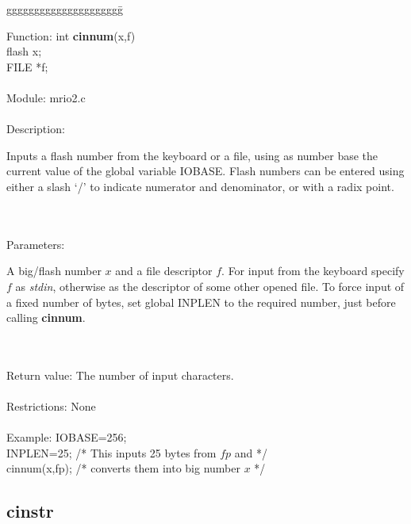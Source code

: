 \begin{tabbing}
ggggggggggggggggggggg\= \kill

      Function:      \>int {\bf cinnum}(x,f)  \\
                     \>flash x;  \\
                     \>FILE *f;  \\
      \ \\
      Module:        \>mrio2.c \\
      \ \\
      Description:   \>
                     \parbox[t]{3in}
                     {Inputs a flash number from the keyboard or a file,  
                     using as number base the current value of the 
                     global variable IOBASE. Flash numbers can be entered 
                     using either a slash `/' to indicate numerator and 
                     denominator, or with a radix point.} \\ 
      \ \\ 
      Parameters:    \>
                     \parbox[t]{3in}
                     {A big/flash number $x$ and a file descriptor $f$. For 
                     input from the keyboard specify $f$ as {\em stdin}, otherwise 
                     as the descriptor of some other opened file. 
                     To force input of a fixed number of 
                     bytes, set global INPLEN to the required number,
                     just before calling {\bf cinnum}.}   \\
      \ \\
      Return value:  \>The number of input characters.   \\
      \ \\
      Restrictions:  \>None        \\
      \ \\
      Example:       \>    IOBASE=256;  \\
                     \>    INPLEN=25; /* This inputs 25 bytes from $fp$ and */ \\
                     \>    cinnum(x,fp);  /* converts them into big number $x$ */\\

\end{tabbing}
\pagebreak
\subsection{cinstr}


